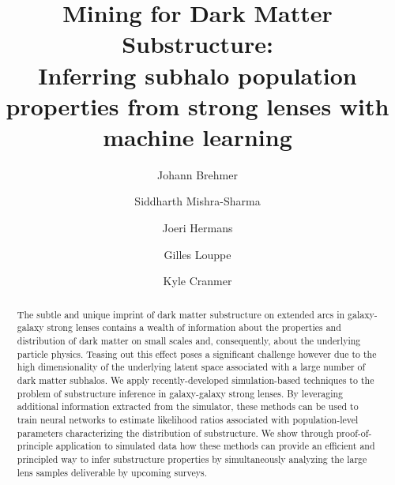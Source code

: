 \documentclass[twocolumn]{aastex62}
\begin{document}
\sloppy\sloppypar\raggedbottom\frenchspacing

\title{\textbf{
Mining for Dark Matter Substructure: \\
Inferring subhalo population properties from strong lenses with machine learning
}}


\author[0000-0003-3344-4209]{Johann Brehmer}

\author[0000-0001-9088-7845]{Siddharth Mishra-Sharma}

\author{Joeri Hermans}

\author[0000-0002-2082-3106]{Gilles Louppe}

\author[0000-0002-5769-7094]{Kyle Cranmer}

\begin{abstract}\noindent
The subtle and unique imprint of dark matter substructure on extended arcs in galaxy-galaxy strong lenses contains a wealth of information about the properties and distribution of dark matter on small scales and, consequently, about the underlying particle physics. Teasing out this effect poses a significant challenge however due to the high dimensionality of the underlying latent space associated with a large number of dark matter subhalos. We apply recently-developed simulation-based techniques to the problem of substructure inference in galaxy-galaxy strong lenses. By leveraging additional information extracted from the simulator, these methods can be used to train neural networks to estimate likelihood ratios associated with population-level parameters characterizing the distribution of substructure. We show through proof-of-principle application to simulated data how these methods can provide an efficient and principled way to infer substructure properties by simultaneously analyzing the large lens samples deliverable by upcoming surveys. \href{https://https://github.com/smsharma/StrongLensing-Inference}{\faGithub}
\end{abstract}
\end{document}
